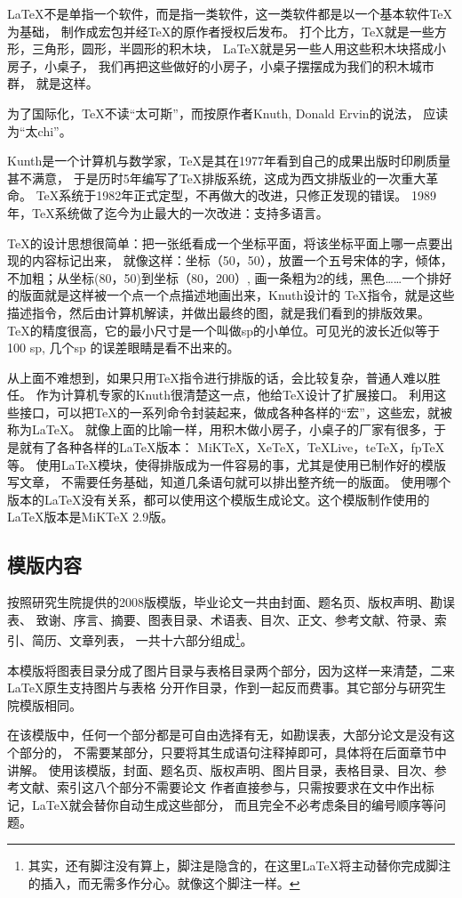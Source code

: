 \LaTeX{}不是单指一个软件，而是指一类软件，这一类软件都是以一个基本软件\TeX\index{\TeX}为基础，
制作成宏包并经\TeX{}的原作者授权后发布。
打个比方，\TeX{}就是一些方形，三角形，圆形，半圆形的积木块，
\LaTeX{}就是另一些人用这些积木块搭成小房子，小桌子，
我们再把这些做好的小房子，小桌子摆摆成为我们的积木城市群，
就是这样。

为了国际化，\TeX{}不读“太可斯”，而按原作者Knuth, Donald Ervin的说法，
应读为“太chi”\cite{LaTeXshzh}。

Kunth是一个计算机与数学家，\TeX{}是其在1977年看到自己的成果出版时印刷质量甚不满意，
于是历时5年编写了\TeX{}排版系统，这成为西文排版业的一次重大革命。
\TeX{}系统于1982年正式定型，不再做大的改进，只修正发现的错误。
1989年，\TeX{}系统做了迄今为止最大的一次改进：支持多语言\cite{LaTeXshzh}。

\TeX{}的设计思想很简单：把一张纸看成一个坐标平面，将该坐标平面上哪一点要出现的内容标记出来，
就像这样：坐标（50，50），放置一个五号宋体的字，倾体，不加粗；从坐标(80，50)到坐标（80，200）,
画一条粗为2的线，黑色……一个排好的版面就是这样被一个点一个点描述地画出来，Knuth设计的
\TeX{}指令，就是这些描述指令，然后由计算机解读，并做出最终的图，就是我们看到的排版效果。
\TeX 的精度很高，它的最小尺寸是一个叫做sp的小单位。可见光的波长近似等于100 sp,
几个sp 的误差眼睛是看不出来的\cite{texbook}。

从上面不难想到，如果只用\TeX 指令进行排版的话，会比较复杂，普通人难以胜任。
作为计算机专家的Knuth很清楚这一点，他给\TeX 设计了扩展接口。
利用这些接口，可以把\TeX 的一系列命令封装起来，做成各种各样的“宏”，这些宏，就被称为\LaTeX{}。
就像上面的比喻一样，用积木做小房子，小桌子的厂家有很多，于是就有了各种各样的\LaTeX{}版本：
MiKTeX，XeTeX，TeXLive，teTeX，fpTeX等。
使用\LaTeX{}模块，使得排版成为一件容易的事，尤其是使用已制作好的模版写文章，
不需要任务基础，知道几条语句就可以排出整齐统一的版面。
使用哪个版本的\LaTeX{}没有关系，都可以使用这个模版生成论文。这个模版制作使用的LaTeX版本是MiKTeX 2.9版。

\subsection{模版内容}

按照研究生院提供的2008版模版，毕业论文一共由封面、题名页、版权声明、勘误表、
致谢、序言、摘要、图表目录、术语表、目次、正文、参考文献、符录、索引、简历、文章列表，
一共十六部分组成\footnote{其实，还有脚注没有算上，脚注是隐含的，在这里\LaTeX{}将主动替你完成脚注的插入，而无需多作分心。就像这个脚注一样。}。

本模版将图表目录分成了图片目录与表格目录两个部分，因为这样一来清楚，二来\LaTeX{}原生支持图片与表格
分开作目录，作到一起反而费事。其它部分与研究生院模版相同。

在该模版中，任何一个部分都是可自由选择有无，如勘误表，大部分论文是没有这个部分的，
不需要某部分，只要将其生成语句注释掉即可，具体将在后面章节中讲解。
使用该模版，封面、题名页、版权声明、图片目录，表格目录、目次、参考文献、索引这八个部分不需要论文
作者直接参与，只需按要求在文中作出标记，\LaTeX{}就会替你自动生成这些部分，
而且完全不必考虑条目的编号顺序等问题。


